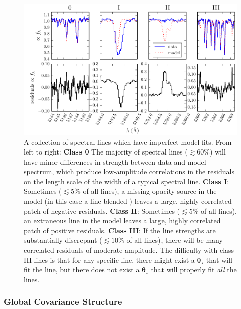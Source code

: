 \documentclass[iop,floatfix]{emulateapj}
\newcommand{\vt}{ {\bm \theta}}
\newcommand{\vtstar}{\vt_{\star}}
\begin{document}
\begin{figure}[!htb]
\begin{center}
  \includegraphics{figs/badlines.pdf}
  \caption{A collection of spectral lines which have imperfect model fits.
    From left to right: \textbf{Class 0} The majority of spectral lines
    ($\gtrsim 60$\%) will have minor differences in strength between data and
    model spectrum, which produce low-amplitude correlations in the residuals
    on the length scale of the width of a typical spectral line.  \textbf{Class
    I}: Sometimes ($\lesssim 5$\% of all lines), a missing opacity source in
    the model (in this case a line-blended ) leaves a large, highly correlated
    patch of negative residuals.  \textbf{Class II}: Sometimes ($\lesssim 5$\%
    of all lines), an extraneous line in the model leaves a large, highly
    correlated patch of positive residuals.  \textbf{Class III}: If the line strengths are
    substantially discrepant ($\lesssim 10$\% of all lines), there will be many
    correlated residuals of moderate amplitude.  The difficulty
    with class III lines is that for any specific line, there might exist a
    $\vtstar$ that will fit the line, but there does not exist a $\vtstar$ that
    will properly fit \emph{all} the lines.}
\label{fig:badlines}
\end{center}
\end{figure}

\subsubsection{Global Covariance Structure}
\end{document}
